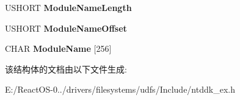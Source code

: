 \begin{DoxyCompactItemize}
U\+S\+H\+O\+RT {\bfseries Module\+Name\+Length}
\item 
\mbox{\label{struct___s_y_s_t_e_m___m_o_d_u_l_e___e_n_t_r_y_a48a438192fcc45a5508305058b94de5c}} 
U\+S\+H\+O\+RT {\bfseries Module\+Name\+Offset}
\item 
\mbox{\label{struct___s_y_s_t_e_m___m_o_d_u_l_e___e_n_t_r_y_a5be6d1d6a6bb79954649406ffeac1f47}} 
C\+H\+AR {\bfseries Module\+Name} \mbox{[}256\mbox{]}
\end{DoxyCompactItemize}


该结构体的文档由以下文件生成\+:\begin{DoxyCompactItemize}
\item 
E\+:/\+React\+O\+S-\/0../drivers/filesystems/udfs/\+Include/ntddk\+\_\+ex.\+h\end{DoxyCompactItemize}
